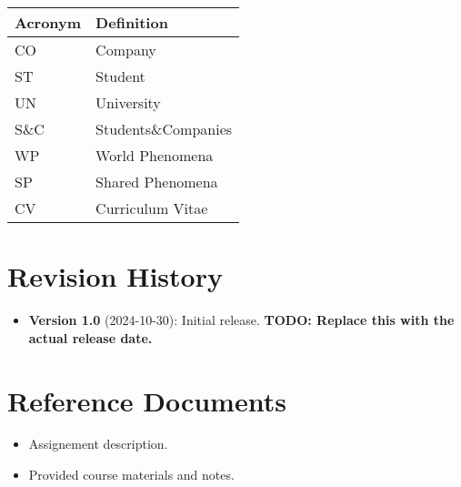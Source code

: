 \begin{longtable}{|l|p{}|}
    \hline
    \textbf{Acronym} & \textbf{Definition} \\
    \hline \hline
    CO               & Company             \\
    \hline
    ST               & Student             \\
    \hline
    UN               & University          \\
    \hline
    S\&C             & Students\&Companies \\
    \hline
    WP               & World Phenomena     \\
    \hline
    SP               & Shared Phenomena    \\
    \hline
    CV               & Curriculum Vitae    \\
    \hline
\end{longtable}

\section{Revision History}
\label{sec:revision-history}%

\begin{itemize}
    \item \textbf{Version 1.0} (2024-10-30): Initial release. \textbf{TODO: Replace this with the actual release date.}
\end{itemize}

\section{Reference Documents}
\label{sec:reference-documents}%

\begin{itemize}
    \item Assignement description.
    \item Provided course materials and notes.
\end{itemize}
